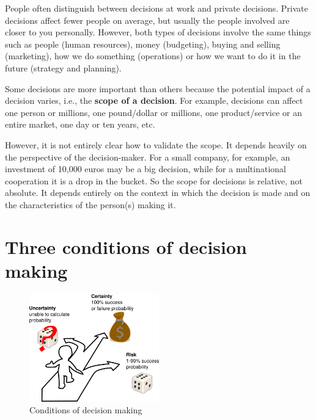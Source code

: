 \documentclass[
  12pt,
  oneside]{book}
\theoremstyle{definition}
\theoremstyle{definition}
\theoremstyle{definition}
\theoremstyle{definition}
\theoremstyle{remark}
\begin{document}
People often distinguish between decisions at work and private decisions. Private decisions affect fewer people on average, but usually the people involved are closer to you personally. However, both types of decisions involve the same things such as people (human resources), money (budgeting), buying and selling (marketing), how we do something (operations) or how we want to do it in the future (strategy and planning).

Some decisions are more important than others because the potential impact of a decision varies, i.e., the \textbf{scope of a decision}. For example, decisions can affect one person or millions, one pound/dollar or millions, one product/service or an entire market, one day or ten years, etc.

However, it is not entirely clear how to validate the scope. It depends heavily on the perspective of the decision-maker. For a small company, for example, an investment of 10,000 euros may be a big decision, while for a multinational cooperation it is a drop in the bucket. So the scope for decisions is relative, not absolute. It depends entirely on the context in which the decision is made and on the characteristics of the person(s) making it.

\hypertarget{three-conditions-of-decision-making}{%
\section{Three conditions of decision making}\label{three-conditions-of-decision-making}}

\begin{figure}
\centering
\includegraphics[width=0.5\textwidth,height=\textheight]{fig/risk-certainty-uncertainty.png}
\caption[\label{fig:3conditions} Conditions of decision making]{\label{fig:3conditions} Conditions of decision making\footnotemark{}}
\end{figure}
\end{document}
